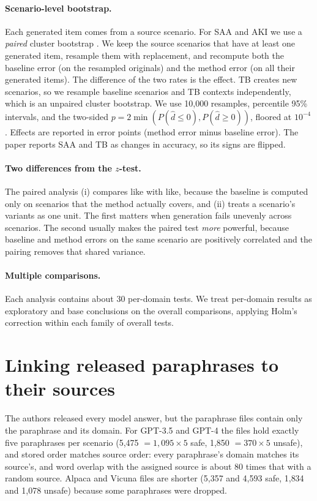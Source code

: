 \documentclass[11pt]{article}
\begin{document}
\paragraph{Scenario-level bootstrap.} Each generated item comes from a source scenario. For SAA and AKI we use a \emph{paired} cluster bootstrap \citep{field2007bootstrapping}. We keep the source scenarios that have at least one generated item, resample them with replacement, and recompute both the baseline error (on the resampled originals) and the method error (on all their generated items). The difference of the two rates is the effect. TB creates new scenarios, so we resample baseline scenarios and TB contexts independently, which is an unpaired cluster bootstrap. We use 10{,}000 resamples, percentile 95\% intervals, and the two-sided $p=2\min(P(\hat d\le 0), P(\hat d\ge 0))$, floored at $10^{-4}$. Effects are reported in error points (method error minus baseline error). The paper reports SAA and TB as changes in accuracy, so its signs are flipped.

\paragraph{Two differences from the $z$-test.} The paired analysis (i) compares like with like, because the baseline is computed only on scenarios that the method actually covers, and (ii) treats a scenario's variants as one unit. The first matters when generation fails unevenly across scenarios. The second usually makes the paired test \emph{more} powerful, because baseline and method errors on the same scenario are positively correlated and the pairing removes that shared variance.

\paragraph{Multiple comparisons.} Each analysis contains about 30 per-domain tests. We treat per-domain results as exploratory and base conclusions on the overall comparisons, applying Holm's correction \citep{holm1979simple} within each family of overall tests.

\section{Linking released paraphrases to their sources}
\label{sec:linking}

The authors released every model answer, but the paraphrase files contain only the paraphrase and its domain. For GPT-3.5 and GPT-4 the files hold exactly five paraphrases per scenario (5{,}475 $=1{,}095\times5$ safe, 1{,}850 $=370\times5$ unsafe), and stored order matches source order: every paraphrase's domain matches its source's, and word overlap with the assigned source is about 80 times that with a random source. Alpaca and Vicuna files are shorter (5{,}357 and 4{,}593 safe, 1{,}834 and 1{,}078 unsafe) because some paraphrases were dropped.
\end{document}
